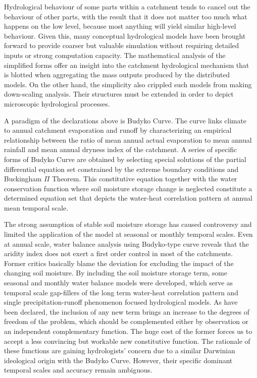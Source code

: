 \documentclass[draft,wrr]{AGUTeX}
\begin{document}
\begin{article}
Hydrological behaviour of some parts within a catchment tends to cancel out the behaviour of other parts, with the result that it does not matter too much what happens on the low level, because most anything will yield similar high-level behaviour\citep{hofstadter1980godel}. Given this, many conceptual hydrological models have been brought forward to provide  coarser but valuable simulation without requiring detailed inputs or strong computation capacity. The mathematical analysis of the simplified forms offer an insight into the catchment hydrological mechanism that is blotted when aggregating the mass outputs produced by the distributed models\citep{gerrits2009analytical,xu2014attribution}. On the other hand, the simplicity also crippled such models from making down-scaling analysis. Their structures must be extended in order to depict microscopic hydrological processes.
 
A paradigm of the declarations above is Budyko Curve\citep{budyko1961heat}. The curve links climate to annual catchment evaporation and runoff by characterizing an empirical relationship between the ratio of mean annual actual evaporation to mean annual rainfall and mean annual dryness index of the catchment\citep{wang2012responses}. A series of specific forms of Budyko Curve are obtained by selecting special solutions of the partial differential equation set constrained  by the extreme boundary conditions and Buckingham $\Pi$ Theorem\citep{FuBaopu,choudhury1999evaluation,yang2008new}. This constitutive equation together with the water conservation function where soil moisture storage change is neglected constitute a determined equation set that depicts the water-heat correlation pattern at annual mean temporal scale\citep{zhang2001response,yang2007analyzing}. 

The strong assumption of stable soil moisture storage has caused controversy and limited the application of the model at seasonal or monthly temporal scales. Even at annual scale, water balance analysis using Budyko-type curve reveals that the aridity index does not exert a first order control in most of the catchments\citep{tekleab2011water}. Former critics basically blame the deviation for excluding the impact of the changing soil moisture\citep{sankarasubramanian2002annual,sankarasubramanian2003hydroclimatology}. By including the soil moisture storage term, some seasonal and monthly water balance models were developed\citep{abcd,xiong1999two,zhang2008water}, which serve as  temporal scale gap-fillers of the long term water-heat correlation pattern and single precipitation-runoff phenomenon focused hydrological models. As have been declared, the inclusion of any new term brings an increase to the degrees of freedom of the problem, which should be complemented either by observation or an independent complementary function. The huge cost of the former forces us to accept a less convincing but workable new constitutive function. The rationale of these functions are gaining hydrologists' concern due to a similar Darwinian ideological origin with the Budyko Curve\citep{wang2014one}. However, their specific dominant temporal scales and accuracy remain ambiguous. 


\end{article}
\end{document}
